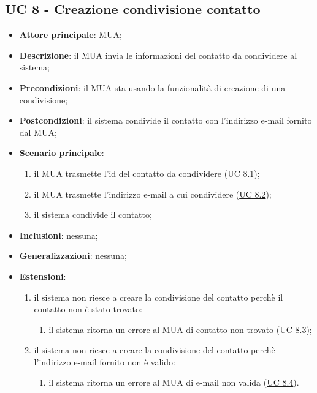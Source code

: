 \subsection{UC 8 - Creazione condivisione contatto} \label{sec:UC8}

    \begin{itemize}
        \item \textbf{Attore principale}: MUA;
        \item \textbf{Descrizione}: il MUA invia le informazioni del contatto da condividere al sistema;
        \item \textbf{Precondizioni}: il MUA sta usando la funzionalità di creazione di una condivisione;
        \item \textbf{Postcondizioni}: il sistema condivide il contatto con l'indirizzo e-mail fornito dal MUA;
        \item \textbf{Scenario principale}:
            \begin{enumerate}
                \item il MUA trasmette l'id del contatto da condividere (\hyperref[sec:UC8.1]{UC 8.1});
                \item il MUA trasmette l'indirizzo e-mail a cui condividere (\hyperref[sec:UC8.2]{UC 8.2});
                \item il sistema condivide il contatto;
            \end{enumerate}
        \item \textbf{Inclusioni}: nessuna;
        \item \textbf{Generalizzazioni}: nessuna;
        \item \textbf{Estensioni}:
        \begin{enumerate}[label=\alph*.]
            \item il sistema non riesce a creare la condivisione del contatto perchè il contatto non è stato trovato:
            \begin{enumerate}[label=\arabic*.]
                \item il sistema ritorna un errore al MUA di contatto non trovato (\hyperref[sec:UC8.3]{UC 8.3});
            \end{enumerate}
            \item il sistema non riesce a creare la condivisione del contatto perchè l'indirizzo e-mail fornito non è valido:
            \begin{enumerate}[label=\arabic*.]
                \item il sistema ritorna un errore al MUA di e-mail non valida (\hyperref[sec:UC8.4]{UC 8.4}).
            \end{enumerate}
        \end{enumerate}
    \end{itemize}


